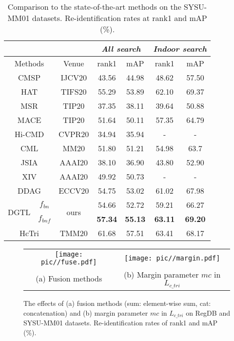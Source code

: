 \documentclass[journal]{IEEEtran}
\begin{document}
\begin{table}
\caption{Comparison to the state-of-the-art methods on the SYSU-MM01 datasets. Re-identification rates at rank1 and mAP (\%).}
\label{tab:sota_sysu}
  \centering
  \begin{tabular}{lc|c|c|c||c|c}
    \toprule[2pt]
    \multicolumn{3}{c|}{}  & \multicolumn{2}{c||}{\emph{All search}} & \multicolumn{2}{c}{\emph{Indoor search}} \\ \hline
      \multicolumn{2}{c|}{Methods} & Venue &   rank1   & mAP   &  rank1  & mAP      \\ \toprule[1pt]
      \multicolumn{2}{c|}{CMSP \cite{wu2020rgb}} & IJCV20 & 43.56   & 44.98  & 48.62   & 57.50  \\
      \multicolumn{2}{c|}{HAT \cite{ye2020vipr}} & TIFS20 & 55.29  & 53.89 & 62.10  & 69.37  \\
      \multicolumn{2}{c|}{MSR \cite{Feng2020LearningMR}} & TIP20 & 37.35  & 38.11  & 39.64  & 50.88  \\
      \multicolumn{2}{c|}{MACE \cite{Ye2020CrossModalityPR}} & TIP20 & 51.64 & 50.11 & 57.35 & 64.79 \\
      \multicolumn{2}{c|}{Hi-CMD \cite{choi2020hi}} & CVPR20 & 34.94  & 35.94   &  - & -   \\
      \multicolumn{2}{c|}{CML \cite{Ling2020ClassAwareMM}} & MM20 & 51.80 & 51.21 & 54.98 & 63.7 \\
      \multicolumn{2}{c|}{JSIA \cite{Wang2020CrossModalityPG}} & AAAI20 & 38.10  & 36.90 & 43.80  & 52.90 \\
      \multicolumn{2}{c|}{XIV \cite{Li2020InfraredVisibleCP}} & AAAI20 & 49.92  & 50.73  &  - & -   \\
\multicolumn{2}{c|}{DDAG \cite{ye2020dynamic}} & ECCV20 & 54.75  & 53.02 & 61.02  & 67.98 \\  \hline
      \multirow{2}{*}{DGTL} & $f_{bn}$ & \multirow{2}{*}{ours} & 54.66 & 52.72 & 59.21 & 66.27 \\
                                & $f_{bnf}$& & \textbf{57.34} & \textbf{55.13} & \textbf{63.11} & \textbf{69.20} \\ \hline  \hline
      \multicolumn{2}{c|}{HcTri \cite{Liu2020ParametersSE}} & TMM20 & 61.68 & 57.51 & 63.41 & 68.17 \\
      \toprule[2pt]
  \end{tabular}
\end{table}

\begin{figure*}
\centering
\begin{tabular}{c@{\hspace{2mm}}c}
\texttt{[image: pic//fuse.pdf]} &
\texttt{[image: pic//margin.pdf]} \\ (a) Fusion methods  & (b) Margin parameter $mc$ in $L_{c\_tri}$
\end{tabular}
\caption{The effects of (a) fusion methods (sum: element-wise sum, cat: concatenation) and (b) margin parameter $mc$ in $L_{c\_tri}$ on RegDB and SYSU-MM01 datasets. Re-identification rates of rank1 and mAP (\%).}
\label{fig:fuse_margin}
\end{figure*}
\end{document}
